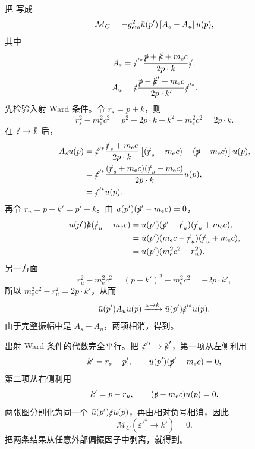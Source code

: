 \begin{exbox}
把 写成
\begin{equation*}
 \mathcal M_C=-g_{\rm em}^2\bar u(p')
 \left[A_s-A_u\right]u(p),
\end{equation*}
其中
\begin{align*}
 A_s&=\slashed\varepsilon'^{*}
 \frac{\slashed p+\slashed k+m_{\mathrm e} c}{2p\cdot k}
 \slashed\varepsilon,\\
 A_u&=\slashed\varepsilon
 \frac{\slashed p-\slashed k'+m_{\mathrm e} c}{2p\cdot k'}
 \slashed\varepsilon'^{*}.
\end{align*}
先检验入射 Ward 条件。令 $r_s=p+k$，则
\begin{equation*}
 r_s^2-m_{\mathrm e}^2c^2
 =p^2+2p\cdot k+k^2-m_{\mathrm e}^2c^2
 =2p\cdot k.
\end{equation*}
在 $\slashed\varepsilon\to\slashed k$ 后，
\begin{align*}
 A_su(p)
 &=\slashed\varepsilon'^{*}
 \frac{\slashed r_s+m_{\mathrm e} c}{2p\cdot k}
 \left[(\slashed r_s-m_{\mathrm e} c)-(\slashed p-m_{\mathrm e} c)\right]u(p),\\
 &=\slashed\varepsilon'^{*}
 \frac{(\slashed r_s+m_{\mathrm e} c)(\slashed r_s-m_{\mathrm e} c)}{2p\cdot k}u(p),\\
 &=\slashed\varepsilon'^{*}u(p).
\end{align*}
再令 $r_u=p-k'=p'-k$。由 $\bar u(p')(\slashed p'-m_{\mathrm e} c)=0$，
\begin{align*}
 \bar u(p')\slashed k(\slashed r_u+m_{\mathrm e} c)
 &=\bar u(p')(\slashed p'-\slashed r_u)(\slashed r_u+m_{\mathrm e} c),\\
 &=\bar u(p')(m_{\mathrm e} c-\slashed r_u)(\slashed r_u+m_{\mathrm e} c),\\
 &=\bar u(p')(m_{\mathrm e}^2c^2-r_u^2).
\end{align*}
另一方面
\begin{equation*}
 r_u^2-m_{\mathrm e}^2c^2
 =(p-k')^2-m_{\mathrm e}^2c^2
 =-2p\cdot k',
\end{equation*}
所以 $m_{\mathrm e}^2c^2-r_u^2=2p\cdot k'$，从而
\begin{equation*}
 \bar u(p')A_u u(p)
 \xrightarrow{\varepsilon\to k}
 \bar u(p')\slashed\varepsilon'^{*}u(p).
\end{equation*}
由于完整振幅中是 $A_s-A_u$，两项相消，得到。

出射 Ward 条件的代数完全平行。把 $\slashed\varepsilon'^{*}\to\slashed k'$，第一项从左侧利用
\begin{equation*}
 k'=r_s-p',
 \qquad
 \bar u(p')(\slashed p'-m_{\mathrm e} c)=0,
\end{equation*}
第二项从右侧利用
\begin{equation*}
 k'=p-r_u,
 \qquad
 (\slashed p-m_{\mathrm e} c)u(p)=0.
\end{equation*}
两张图分别化为同一个 $\bar u(p')\slashed\varepsilon u(p)$，再由相对负号相消，因此
\begin{equation*}
 \mathcal M_C(\varepsilon'^{*}\to k')=0.
\end{equation*}
把两条结果从任意外部偏振因子中剥离，就得到。


\end{exbox}
